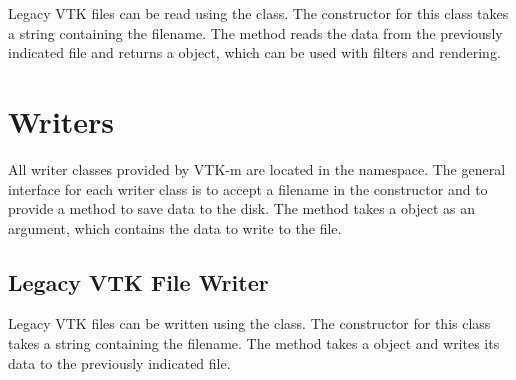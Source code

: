 Legacy VTK files can be read using the 
class. The constructor for this class takes a string containing the
filename. The  method reads the data from the
previously indicated file and returns a  object, which
can be used with filters and rendering.



\section{Writers}


All writer classes provided by VTK-m are located in the \vtkmiowriter{}
namespace. The general interface for each writer class is to accept a
filename in the constructor and to provide a  method
to save data to the disk. The  method takes a
 object as an argument, which contains the data to write
to the file.

\subsection{Legacy VTK File Writer}


Legacy VTK files can be written using the 
class. The constructor for this class takes a string containing the
filename. The  method takes a 
object and writes its data to the previously indicated file.


